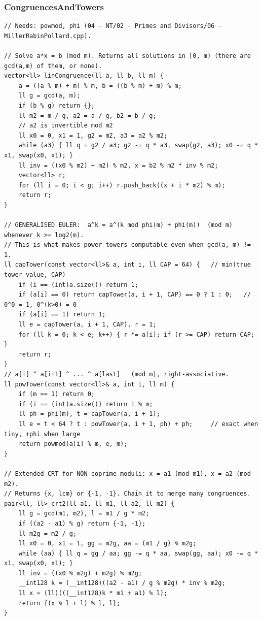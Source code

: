 \documentclass[9pt,a4paper,twocolumn]{extarticle}
\begin{document}
\filbreak
\subsubsection{CongruencesAndTowers}
\nopagebreak
\begin{lstlisting}
// Needs: powmod, phi (04 - NT/02 - Primes and Divisors/06 - MillerRabinPollard.cpp).

// Solve a*x = b (mod m). Returns all solutions in [0, m) (there are gcd(a,m) of them, or none).
vector<ll> linCongruence(ll a, ll b, ll m) {
    a = ((a % m) + m) % m, b = ((b % m) + m) % m;
    ll g = gcd(a, m);
    if (b % g) return {};
    ll m2 = m / g, a2 = a / g, b2 = b / g;
    // a2 is invertible mod m2
    ll x0 = 0, x1 = 1, g2 = m2, a3 = a2 % m2;
    while (a3) { ll q = g2 / a3; g2 -= q * a3, swap(g2, a3); x0 -= q * x1, swap(x0, x1); }
    ll inv = ((x0 % m2) + m2) % m2, x = b2 % m2 * inv % m2;
    vector<ll> r;
    for (ll i = 0; i < g; i++) r.push_back((x + i * m2) % m);
    return r;
}

// GENERALISED EULER:  a^k = a^(k mod phi(m) + phi(m))  (mod m)  whenever k >= log2(m).
// This is what makes power towers computable even when gcd(a, m) != 1.
ll capTower(const vector<ll>& a, int i, ll CAP = 64) {   // min(true tower value, CAP)
    if (i == (int)a.size()) return 1;
    if (a[i] == 0) return capTower(a, i + 1, CAP) == 0 ? 1 : 0;   // 0^0 = 1, 0^(k>0) = 0
    if (a[i] == 1) return 1;
    ll e = capTower(a, i + 1, CAP), r = 1;
    for (ll k = 0; k < e; k++) { r *= a[i]; if (r >= CAP) return CAP; }
    return r;
}
// a[i] ^ a[i+1] ^ ... ^ a[last]   (mod m), right-associative.
ll powTower(const vector<ll>& a, int i, ll m) {
    if (m == 1) return 0;
    if (i == (int)a.size()) return 1 % m;
    ll ph = phi(m), t = capTower(a, i + 1);
    ll e = t < 64 ? t : powTower(a, i + 1, ph) + ph;     // exact when tiny, +phi when large
    return powmod(a[i] % m, e, m);
}

// Extended CRT for NON-coprime moduli: x = a1 (mod m1), x = a2 (mod m2).
// Returns {x, lcm} or {-1, -1}. Chain it to merge many congruences.
pair<ll, ll> crt2(ll a1, ll m1, ll a2, ll m2) {
    ll g = gcd(m1, m2), l = m1 / g * m2;
    if ((a2 - a1) % g) return {-1, -1};
    ll m2g = m2 / g;
    ll x0 = 0, x1 = 1, gg = m2g, aa = (m1 / g) % m2g;
    while (aa) { ll q = gg / aa; gg -= q * aa, swap(gg, aa); x0 -= q * x1, swap(x0, x1); }
    ll inv = ((x0 % m2g) + m2g) % m2g;
    __int128 k = (__int128)((a2 - a1) / g % m2g) * inv % m2g;
    ll x = (ll)(((__int128)k * m1 + a1) % l);
    return {(x % l + l) % l, l};
}
\end{lstlisting}
\end{document}
